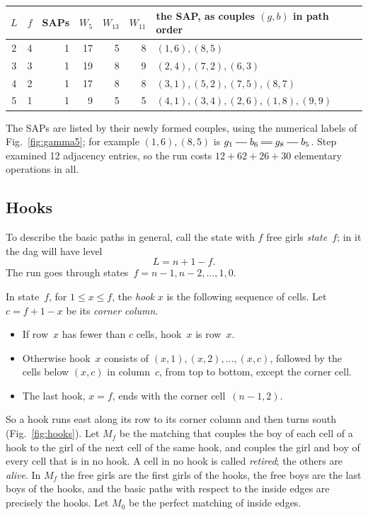 \begin{center}\small
\begin{tabular}{crrrrrl}
\toprule
$L$&$f$&SAPs&$W_5$&$W_{13}$&$W_{11}$&the SAP, as couples $(g,b)$ in path order\\
\midrule
2&4&1&17&5&8&$(1,6),(8,5)$\\
3&3&1&19&8&9&$(2,4),(7,2),(6,3)$\\
4&2&1&17&8&8&$(3,1),(5,2),(7,5),(8,7)$\\
5&1&1&9&5&5&$(4,1),(3,4),(2,6),(1,8),(9,9)$\\
\bottomrule
\end{tabular}
\end{center}
\noindent
The SAPs are listed by their newly formed couples, using the numerical
labels of Fig.~\ref{fig:gamma5}; for example $(1,6),(8,5)$ is
$g_1\sg b_6\db g_8\sg b_5$. Step
 examined 12 adjacency entries, so the run costs $12+62+26+30$
elementary operations in all.

\subsection{Hooks}
\label{sec:hooks}

To describe the basic paths in general, call the state with $f$ free girls
\emph{state~$f$}; in it the dag will have level
\[
   L=n+1-f.
\]
The run goes through states~$f=n-1,n-2,\ldots,1,0$.

\begin{definition}
In state~$f$, for $1\le x\le f$, the \emph{hook} $x$ is the following
sequence of cells. Let $c=f+1-x$ be its \emph{corner column}.
\begin{itemize}
\item If row~$x$ has fewer than $c$ cells, hook~$x$ is row~$x$.
\item Otherwise hook~$x$ consists of $(x,1),(x,2),\ldots,(x,c)$, followed by
  the cells below $(x,c)$ in column~$c$, from top to bottom, except the
  corner cell.
\item The last hook, $x=f$, ends with the corner cell~$(n-1,2)$.
\end{itemize}
\end{definition}

So a hook runs east along its row to its corner column and then turns
south (Fig.~\ref{fig:hooks}). Let $M_f$ be the matching that couples
the boy of each cell of a hook to the girl of the next cell of the same
hook, and couples the girl and boy of every cell that is in no hook. A
cell in no hook is called \emph{retired}; the others are \emph{alive}.
In $M_f$ the free girls are the first girls of the hooks, the free boys
are the last boys of the hooks, and the basic paths with respect to the
inside edges are precisely the hooks. Let $M_0$ be the perfect matching
of inside edges.

